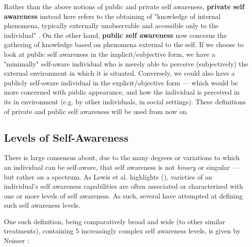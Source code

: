 	Rather than the above notions of public and private self awareness, \textbf{private self awareness} instead here refers to the obtaining of "knowledge of internal phenomena, typically externally unobservable and accessible only to the individual" \cite{sacs16_ch2}. On the other hand, \textbf{public self awareness} now concerns the gathering of knowledge based on phenomena external to the self. If we choose to look at public self awareness in the implicit/subjective form, we have a "minimally" self-aware individual who is merely able to perceive (subjectively) the external environment in which it is situated. Conversely, we could also have a publicly self-aware individual in the explicit/objective form — which would be more concerned with public appearance, and how the individual is perceived in its in environment (e.g. by other individuals, in social settings). These definitions of private and public self awareness will be used from now on.


	\subsection{Levels of Self-Awareness}
	\label{subsec:SA_levels}

	There is large consensus about, due to the many degrees or variations to which an individual can be self-aware, that self awareness is not \textit{binary} or singular — but rather on a spectrum. As Lewis et al. highlights (\cite{sacs16_ch2, sacs17_ch3}), varieties of an individual's self awareness capabilities are often associated or characterized with one or more levels of self awareness. As such, several have attempted at defining such self awareness levels.

	One such definition, being comparatively broad and wide (to other similar treatments), containing 5 increasingly complex self awareness levels, is given by Neisser \cite{neisser1997roots}:

